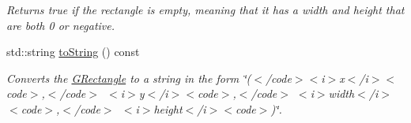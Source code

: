 \begin{DoxyCompactItemize}
\begin{DoxyCompactList}\small\item\em Returns {\ttfamily true} if the rectangle is empty, meaning that it has a width and height that are both 0 or negative. \end{DoxyCompactList}\item 
std\+::string \mbox{\hyperlink{classGRectangle_a1fe5121d6528fdea3f243321b3fa3a49}{to\+String}} () const
\begin{DoxyCompactList}\small\item\em Converts the {\ttfamily \mbox{\hyperlink{classGRectangle}{G\+Rectangle}}} to a string in the form {\ttfamily \char`\"{}($<$/code$>$$<$i$>$x$<$/i$>$$<$code$>$,$<$/code$>$~$<$i$>$y$<$/i$>$$<$code$>$,$<$/code$>$
$<$i$>$width$<$/i$>$$<$code$>$,$<$/code$>$~$<$i$>$height$<$/i$>$$<$code$>$)\char`\"{}}. \end{DoxyCompactList}\end{DoxyCompactItemize}
